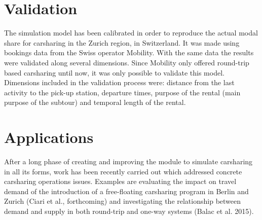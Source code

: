 \section{Validation}
The simulation model has been calibrated in order to reproduce the actual modal share for carsharing in the Zurich region, in Switzerland. It was made using bookings data from the Swiss operator Mobility. With the same data the results were validated along several dimensions. Since Mobility only offered round-trip based carsharing until now, it was only possible to validate this model.  Dimensions included in the validation process were: distance from the last activity to the pick-up station, departure times, purpose of the rental (main purpose of the subtour) and temporal length of the rental. 

\section{Applications}
After a long phase of creating and improving the module to simulate carsharing in all its forms, work has been recently carried out which addressed concrete carsharing operations issues. Examples are evaluating the impact on travel demand of the introduction of a free-floating carsharing program in Berlin \citep[][]{CiariEtAl_TRB_2014} and Zurich (Ciari et al., forthcoming) and investigating the relationship between demand and supply in both round-trip and one-way systems (Balac et al. 2015).




